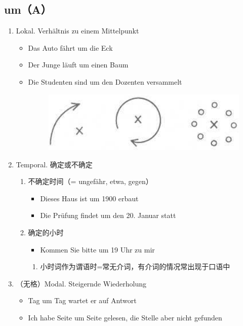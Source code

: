 \documentclass[UTF8]{report}
\begin{document}
\subsection{um（A）}
\begin{enumerate}
    \item Lokal. Verhältnis zu einem Mittelpunkt
    \begin{itemize}
        \item Das Auto fährt um die Eck
        \item Der Junge läuft um einen Baum
        \item Die Studenten sind um den Dozenten versammelt
        \begin{figure}[H]
            \centering
            \includegraphics[scale=0.3]{um.png}
        \end{figure}
    \end{itemize}
    \item Temporal. 确定或不确定
    \begin{enumerate}
        \item 不确定时间（= ungefähr, etwa, gegen）
        \begin{itemize}
            \item Dieses Haus ist um 1900 erbaut
            \item Die Prüfung findet um den 20. Januar statt
        \end{itemize}
        \item 确定的小时
        \begin{itemize}
            \item Kommen Sie bitte um 19 Uhr zu mir
        \end{itemize}
        \begin{enumerate}
            \item 小时词作为谓语时=常无介词，有介词的情况常出现于口语中
        \end{enumerate}
    \end{enumerate}
    \item （无格）Modal. Steigernde Wiederholung
    \begin{itemize}
        \item Tag um Tag wartet er auf Antwort
        \item Ich habe Seite um Seite gelesen, die Stelle aber nicht gefunden
    \end{itemize}
\end{enumerate}
\end{document}
